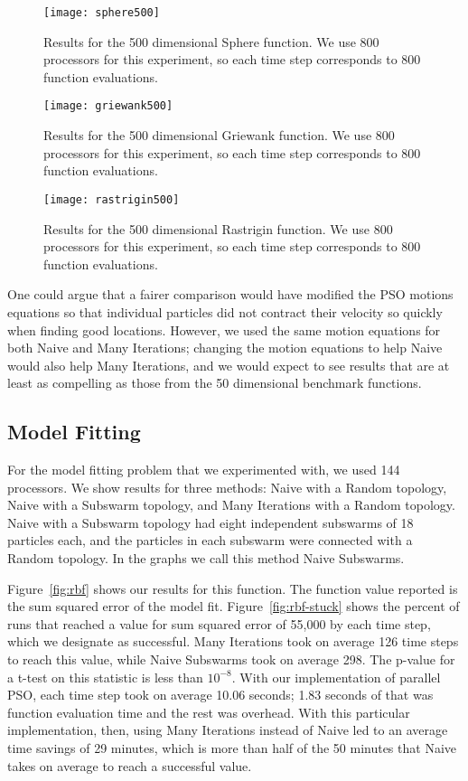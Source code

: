 \documentclass[smallcondensed]{svjour3}
\newcommand{\fig}[1]{Figure~\ref{fig:#1}}
\begin{document}
\begin{figure}
  \centering
  \texttt{[image: sphere500]}
  \caption{Results for the 500 dimensional Sphere function.  We use 800
  processors for this experiment, so each time step corresponds to 800 function
  evaluations.}
  \label{fig:sphere500}
\end{figure}

\begin{figure}
  \centering
  \texttt{[image: griewank500]}
  \caption{Results for the 500 dimensional Griewank function.  We use 800
  processors for this experiment, so each time step corresponds to 800 function
  evaluations.}
  \label{fig:griewank500}
\end{figure}

\begin{figure}
  \centering
  \texttt{[image: rastrigin500]}
  \caption{Results for the 500 dimensional Rastrigin function.  We use 800
  processors for this experiment, so each time step corresponds to 800 function
  evaluations.}
  \label{fig:rastrigin500}
\end{figure}

One could argue that a fairer comparison would have modified the PSO motions
equations so that individual particles did not contract their velocity so
quickly when finding good locations.  However, we used the same motion
equations for both Naive and Many Iterations; changing the motion equations
to help Naive would also help Many Iterations, and we would expect to see
results that are at least as compelling as those from the 50 dimensional
benchmark functions.

\subsection{Model Fitting}
\label{sec:model}

For the model fitting problem that we experimented with, we used 144
processors.  We show results for three methods: Naive with a Random topology,
Naive with a Subswarm topology, and Many Iterations with a Random topology.
Naive with a Subswarm topology had eight independent subswarms of 18
particles each, and the particles in each subswarm were connected with a Random
topology.  In the graphs we call this method Naive Subswarms.

\fig{rbf} shows our results for this function.  The function value reported is
the sum squared error of the model fit.  \fig{rbf-stuck} shows the percent of
runs that reached a value for sum squared error of 55,000 by each time step,
which we designate as successful.  Many Iterations took on average 126 time
steps to reach this value, while Naive Subswarms took on average 298.  The
p-value for a t-test on this statistic is less than $10^{-8}$.  With our
implementation of parallel PSO, each time step took on average 10.06 seconds;
1.83 seconds of that was function evaluation time and the rest was overhead.
With this particular implementation, then, using Many Iterations instead of
Naive led to an average time savings of 29 minutes, which is more than half
of the 50 minutes that Naive takes on average to reach a successful value.
\end{document}
